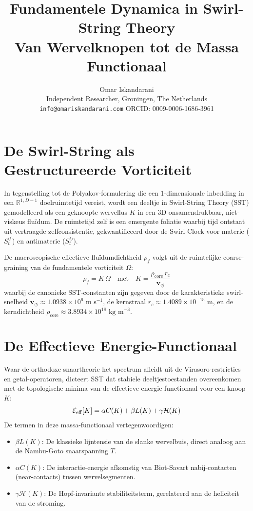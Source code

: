 \documentclass[12pt,a4paper]{article}
\title{\textbf{Fundamentele Dynamica in Swirl-String Theory}\\
\large Van Wervelknopen tot de Massa Functionaal}
\author{Omar Iskandarani\\
\small Independent Researcher, Groningen, The Netherlands\\
\small \texttt{info@omariskandarani.com} \quad ORCID: 0009-0006-1686-3961}
\date{}
\begin{document}
    \maketitle
    
    \section{De Swirl-String als Gestructureerde Vorticiteit}
        
        In tegenstelling tot de Polyakov-formulering die een $1$-dimensionale inbedding in een $\mathbb{R}^{1,D-1}$ doelruimtetijd vereist, wordt een deeltje in Swirl-String Theory (SST) gemodelleerd als een geknoopte wervellus $K$ in een $3$D onsamendrukbaar, niet-viskeus flu\"idum. De ruimtetijd zelf is een emergente foliatie waarbij tijd ontstaat uit vertraagde zelfconsistentie, gekwantificeerd door de Swirl-Clock voor materie ($S_t^{\boldsymbol{\circlearrowleft}}$) en antimaterie ($S_t^{\boldsymbol{\circlearrowright}}$).
        
        De macroscopische effectieve flu\"idumdichtheid $\rho_{\!f}$ volgt uit de ruimtelijke coarse-graining van de fundamentele vorticiteit $\Omega$:
        \begin{equation}
            \rho_{\!f} = K\,\Omega \quad \text{met} \quad K = \frac{\rho_{\text{core}}\,r_c}{\mathbf{v}_{\!\boldsymbol{\circlearrowleft}}}
        \end{equation}
        waarbij de canonieke SST-constanten zijn gegeven door de karakteristieke swirl-snelheid $\mathbf{v}_{\!\boldsymbol{\circlearrowleft}} \approx 1.0938 \times 10^6 \text{ m s}^{-1}$, de kernstraal $r_c \approx 1.4089 \times 10^{-15} \text{ m}$, en de kerndichtheid $\rho_{\text{core}} \approx 3.8934 \times 10^{18} \text{ kg m}^{-3}$.
    
    \section{De Effectieve Energie-Functionaal}
        
        Waar de orthodoxe snaartheorie het spectrum afleidt uit de Virasoro-restricties en getal-operatoren, dicteert SST dat stabiele deeltjestoestanden overeenkomen met de topologische minima van de effectieve energie-functionaal voor een knoop $K$:
        \begin{equation}
            \mathcal{E}_{\rm eff}[K] = \alpha C(K) + \beta L(K) + \gamma \mathcal{H}(K)
        \end{equation}
        De termen in deze massa-functionaal vertegenwoordigen:
        \begin{itemize}
            \item $\beta L(K)$: De klassieke lijntensie van de slanke wervelbuis, direct analoog aan de Nambu-Goto snaarspanning $T$.
            \item $\alpha C(K)$: De interactie-energie afkomstig van Biot-Savart nabij-contacten (near-contacts) tussen wervelsegmenten.
            \item $\gamma \mathcal{H}(K)$: De Hopf-invariante stabiliteitsterm, gerelateerd aan de heliciteit van de stroming.
        \end{itemize}
    
\end{document}
